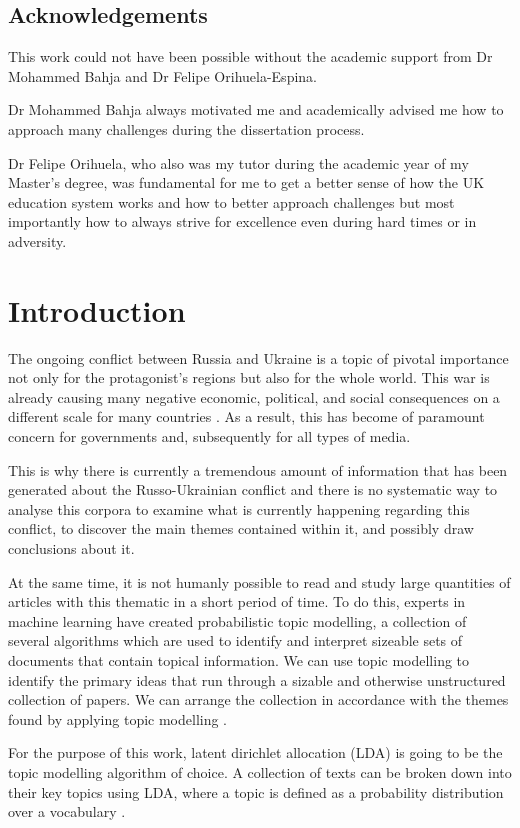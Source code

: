 \documentclass[twoside,12pt,a4paper]{article}
\begin{document}
\subsection{Acknowledgements}
This work could not have been possible without the academic support from Dr Mohammed Bahja and Dr Felipe Orihuela-Espina.

Dr Mohammed Bahja always motivated me and academically advised me how to approach many challenges during the dissertation process.

Dr Felipe Orihuela, who also was my tutor during the academic year of my Master's degree, was fundamental for me to get a better sense of how the UK education system works and how to better approach challenges but most importantly how to always strive for excellence even during hard times or in adversity.

\clearpage
\section{Introduction}
The ongoing conflict between Russia and Ukraine is a topic of pivotal importance not only for the protagonist's regions but also for the whole world. This war is already causing many negative economic, political, and social consequences on a different scale for many countries \citep{caldara_effect_2022}. As a result, this has become of paramount concern for governments and, subsequently for all types of media.

This is why there is currently a tremendous amount of information that has been generated about the Russo-Ukrainian conflict and there is no systematic way to analyse this corpora to examine what is currently happening regarding this conflict, to discover the main themes contained within it, and possibly draw conclusions about it.

At the same time, it is not humanly possible to read and study large quantities of articles with this thematic in a short period of time. To do this, experts in machine learning have created probabilistic topic modelling, a collection of several algorithms which are used to identify and interpret sizeable sets of documents that contain topical information. We can use topic modelling to identify the primary ideas that run through a sizable and otherwise unstructured collection of papers. We can arrange the collection in accordance with the themes found by applying topic modelling \citep{blei_probabilistic_2012}.

For the purpose of this work, latent dirichlet allocation (LDA) is going to be the topic modelling algorithm of choice. A collection of texts can be broken down into their key topics using LDA, where a topic is defined as a probability distribution over a vocabulary \citep{blei_latent_nodate}.
\end{document}
